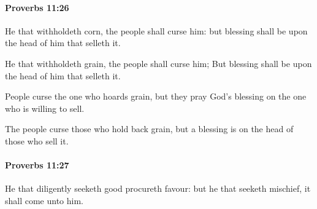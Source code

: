 		\paragraph{Proverbs 11:26} %
			\label{PROVERBS-11-26}

			He that withholdeth corn, the people shall curse him: but blessing shall be upon the head of him that selleth it.

			\begin{versebox}
					\item[BHS] 
					\item[ASV] He that withholdeth grain, the people shall curse him; But blessing shall be upon the head of him that selleth it.
					\item[NIV] People curse the one who hoards grain, but they pray God’s blessing on the one who is willing to sell.
					\item[NRSV] The people curse those who hold back grain, but a blessing is on the head of those who sell it.
			\end{versebox}

		\paragraph{Proverbs 11:27} %
			\label{PROVERBS-11-27}

			He that diligently seeketh good procureth favour: but he that seeketh mischief, it shall come unto him.

